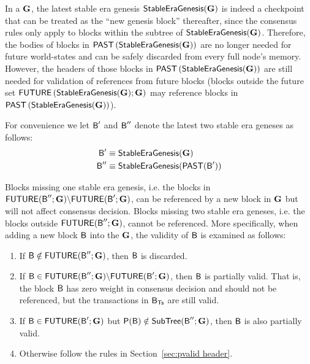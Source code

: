 {	In a \tg $\textbf{G}$, the latest stable era genesis $\mathsf{StableEraGenesis}(\textbf{G})$ is indeed a checkpoint that can be treated as the ``new genesis block'' thereafter, 
	since the consensus rules only apply to blocks within the subtree of $\mathsf{StableEraGenesis}(\textbf{G})$.
	Therefore, the bodies of blocks in $\mathsf{PAST}\left(\mathsf{StableEraGenesis}(\textbf{G})\right)$ are no longer needed for future world-states and can be safely discarded from every full node's memory.
	However, the headers of those blocks in $\mathsf{PAST}\left(\mathsf{StableEraGenesis}(\textbf{G})\right)$ are still needed for validation of references from future blocks (blocks outside the future set $\mathsf{FUTURE}\left(\mathsf{StableEraGenesis}(\textbf{G});\textbf{G}\right)$ may reference blocks in $\mathsf{PAST}\left(\mathsf{StableEraGenesis}(\textbf{G})\right)$). 

	For convenience we let $\textsf{B}'$ and $\textsf{B}''$ denote the latest two stable era geneses as follows:
	\begin{align*}
		\textsf{B}' &\equiv \mathsf{StableEraGenesis}(\textbf{G})\\
		\textsf{B}'' &\equiv \mathsf{StableEraGenesis}(\mathsf{PAST}(\textsf{B}'))
	\end{align*}

	Blocks missing one stable era genesis, i.e. the blocks in $\mathsf{FUTURE}(\textsf{B}'';\textbf{G})\backslash\mathsf{FUTURE}(\textsf{B}';\textbf{G})$, can be referenced by a new block in $\textbf{G}$ but will not affect consensus decision.
	Blocks missing two stable era geneses, i.e. the blocks outside $\mathsf{FUTURE}(\textsf{B}'';\textbf{G})$, cannot be referenced.
	More specifically, when adding a new block $\textsf{B}$ into the \tg $\textbf{G}$, the validity of $\textsf{B}$ is examined as follows:
	\begin{enumerate}
		\item If $\textsf{B} \notin \mathsf{FUTURE}(\textsf{B}'';\textbf{G})$, then $\textsf{B}$ is discarded.

	    \item If $\textsf{B}\in \mathsf{FUTURE}(\textsf{B}'';\textbf{G})\backslash\mathsf{FUTURE}(\textsf{B}';\textbf{G})$, 
	    then $\textsf{B}$ is partially valid.
	    That is, the block $\textsf{B}$ has zero weight in consensus decision and should not be referenced, but the transactions in $\textsf{B}_{\textsf{Ts}}$ are still valid.

	    \item If $\textsf{B}\in  \mathsf{FUTURE}(\textsf{B}';\textbf{G})$ but
	    $\mathsf{P}{\left({\textsf{B}} \right)} \notin  \mathsf{SubTree}(\textsf{B}'';\textbf{G})$,
	    then $\textsf{B}$ is also partially valid.
	  

	    \item Otherwise follow the rules in Section~\ref{sec:pvalid header}.
	\end{enumerate}
}

